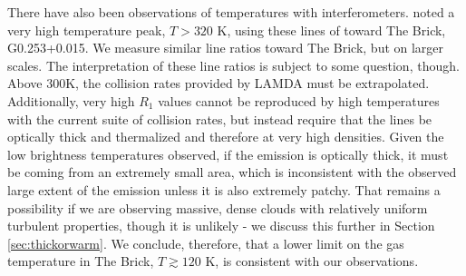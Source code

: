 There have also been observations of \para temperatures with interferometers.
\citet{Johnston2014a} noted a very high temperature peak, $T>320$ K, using these
lines of \para toward The Brick, G0.253+0.015.  We measure similar line
ratios toward The Brick, but on larger scales.  The interpretation of these
line ratios is subject to some question, though.  Above 300K, the collision
rates provided by LAMDA \citep{Green1991a,Schoier2005a,Wiesenfeld2013a} must be
extrapolated.  Additionally, very high $R_1$ values cannot be
reproduced by high temperatures with the current suite of collision rates, but
instead require that the lines be optically thick and thermalized and therefore
at very high densities.   Given the low brightness temperatures observed, if
the emission is optically thick, it must be coming from an extremely small
area, which is inconsistent with the observed large extent of the emission
unless it is also extremely patchy.  That remains a possibility if we are
observing massive, dense clouds with relatively uniform turbulent properties,
though it is unlikely - we discuss this further in Section
\ref{sec:thickorwarm}.  We conclude, therefore, that a lower limit on the
gas temperature in The Brick, $T\gtrsim120$ K, is consistent with our observations.



%

